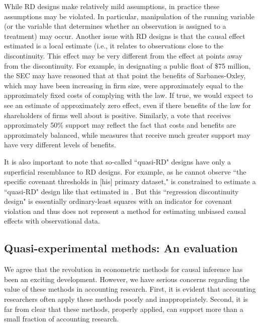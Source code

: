 \documentclass[11pt,reqno,titlepage]{amsart}
\begin{document}
\begin{doublespace}
While RD designs make relatively mild assumptions, in practice these assumptions may be violated.
In particular, manipulation of the running variable (or the variable that determines whether an observation is assigned to a treatment)  may occur.
Another issue with RD designs is that the causal effect estimated is a local estimate (i.e., it relates to observations close to the discontinuity.
This effect may be very different from the effect at points away from the discontinuity.
For example, in designating a public float of \$75 million, the SEC may have reasoned that at that point the benefits of Sarbanes-Oxley, which may have been increasing in firm size, were approximately equal to the approximately fixed costs of complying with the law.
If true, we would expect to see an estimate of approximately zero effect, even if there benefits of the law for shareholders of firms well about is positive.
Similarly, a vote that receives approximately 50\% support may reflect the fact that costs and benefits are approximately balanced, while measures that receive much greater support may have very different levels of benefits.

It is also important to note that so-called ``quasi-RD" designs have only a superficial resemblance to RD designs.
For example, as he cannot observe ``the specific covenant thresholds in [his] primary dataset," \citet{Tan:2013ce} is constrained to estimate a ``quasi-RD" design like that estimated in \citet{Roberts:2009ka}.
But this ``regression discontinuity design" is essentially ordinary-least squares with an indicator for covenant violation and thus does not represent a method for estimating unbiased causal effects with observational data.


\subsection{Quasi-experimental methods: An evaluation}
We agree that the revolution in econometric methods for causal inference has been an exciting development.
However, we have serious concerns regarding the value of these methods in accounting research. 
First, it is evident that accounting researchers often apply these methods poorly and inappropriately.
Second, it is far from clear that these methods, properly applied, can support more than a small fraction of accounting research.


\end{doublespace}
\end{document}
